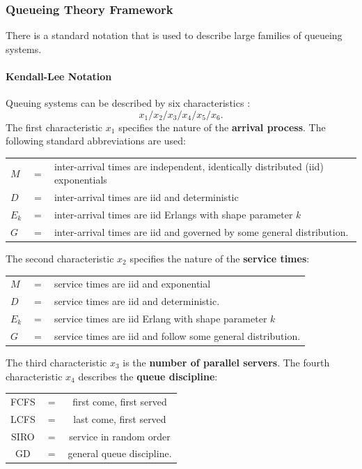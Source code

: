 
\subsubsection{Queueing Theory Framework}
There is a standard notation that is used to describe large families of queueing systems.
\paragraph{Kendall-Lee Notation}
Queuing systems can be described by six characteristics \cite{QS_K}: $$x_1/x_2/x_3/x_4/x_5/x_6.$$
The first characteristic $x_1$ specifies the nature of the \textbf{arrival process}. The following standard abbreviations are used:
\newl \begin{tabular}{p{0.25cm}p{0.25cm}p{15cm}}
$M$ &$=$& inter-arrival times are independent, identically distributed (iid) exponentials\\
$D$ &$=$& inter-arrival times are iid and deterministic\\
$E_{k}$ &$=$& inter-arrival times are iid Erlangs with shape parameter $k$\\
$G$ &$=$& inter-arrival times are iid and governed by some general distribution.
\end{tabular}
\newpage\noindent
The second characteristic $x_2$ specifies the nature of the \textbf{service times}:
\newline \newline
\begin{tabular}{p{0.25cm}p{}p{12cm}}
$M$ &$=$& service times are iid and exponential\\
$D$ &$=$&  service times are iid and deterministic.\\
$E_{k}$ &$=$& service times are iid Erlang with shape parameter $k$\\
$G$ &$=$& service times are iid and follow some general distribution.
\end{tabular}
\newl
The third characteristic $x_3$ is the \textbf{number of parallel servers}. The fourth characteristic $x_4$ describes
the \textbf{queue discipline}:
\newl
\begin{tabular}{ccc}
FCFS &$=$& first come, first served\\
LCFS &$=$& last come, first served\\
SIRO &$=$& service in random order\\
GD &$=$& general queue discipline.
\end{tabular}
